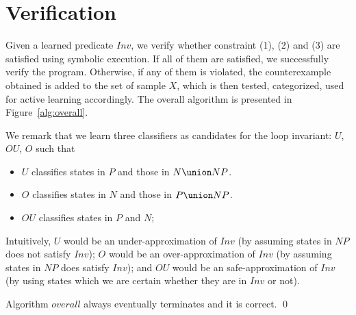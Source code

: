 
\section{Verification}
Given a learned predicate $Inv$, we verify whether constraint (1), (2) and (3) are satisfied using symbolic execution. 
If all of them are satisfied, we successfully verify the program. 
Otherwise, if any of them is violated, the counterexample obtained is added to the set of sample $X$,
 which is then tested, categorized, used for active learning accordingly. 
 The overall algorithm is presented in Figure~\ref{alg:overall}.

We remark that we learn three classifiers as candidates for the loop invariant: $U$, $OU$, $O$ such that
\begin{itemize}
\item $U$ classifies states in $P$ and those in $N \union NP$.
\item $O$ classifies states in $N$ and those in $P \union NP$.
\item $OU$ classifies states in $P$ and $N$;
\end{itemize}
Intuitively, $U$ would be an under-approximation of $Inv$ (by assuming states in $NP$ does not satisfy $Inv$); 
$O$ would be an over-approximation of $Inv$ (by assuming states in $NP$ does satisfy $Inv$); 
and $OU$ would be an safe-approximation of $Inv$ (by using states which we are certain whether they are in $Inv$ or not).
\begin{example}
\end{example}


\begin{theorem}
Algorithm $overall$ always eventually terminates and it is correct. \hfill \qed
\end{theorem}
